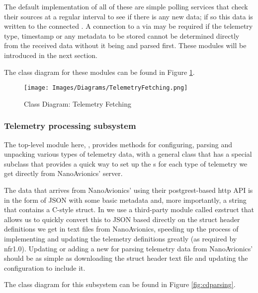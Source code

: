 The default implementation of all of these are simple polling services that check their sources at a regular interval to see if there is any new data; if so this data is written to the connected . A connection to a  via  may be required if the telemetry type, timestamp or any metadata to be stored cannot be determined directly from the received data without it being  and parsed first. These modules will be introduced in the next section.

The class diagram for these modules can be found in Figure \ref{fig:cdfetching}.

\begin{figure}[H]
  \centering
  \texttt{[image: Images/Diagrams/TelemetryFetching.png]}
  \caption{Class Diagram: Telemetry Fetching}
  \label{fig:cdfetching}
\end{figure}

\subsubsection{Telemetry processing subsystem}
The top-level module here, , provides methods for configuring, parsing and \gls{unpacking} various types of telemetry data, with a general class  that has a special subclass  that provides a quick way to set up the s for each type of telemetry we get directly from NanoAvionics’ server.

The data that arrives from NanoAvionics’ using their \Gls{postgrest}-based \acrshort{http} API is in the form of JSON with some basic metadata and, more importantly, a string that contains a  C-style \gls{struct}. In  we use a third-party module called \gls{ezstruct} that allows us to quickly convert this to JSON based directly on the \gls{struct} header definitions we get in text files from NanoAvionics, speeding up the process of implementing and updating the telemetry definitions greatly (as required by \acrshort{nfr}1.0). Updating or adding a new  for parsing telemetry data from NanoAvionics’ should be as simple as downloading the \gls{struct} header text file and updating the configuration to include it.

The class diagram for this subsystem can be found in Figure \ref{fig:cdparsing}.

